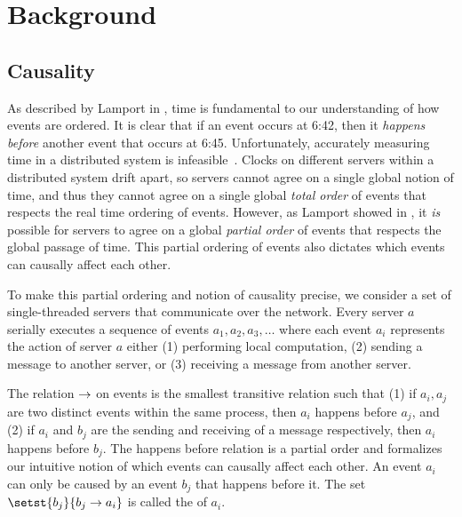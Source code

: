 \newcommand{\ttt}[1]{\texttt{#1}}

\section{Background}

\subsection{Causality}
As described by Lamport in \cite{lamport1978time}, time is fundamental to our
understanding of how events are ordered. It is clear that if an event occurs at
6:42, then it \emph{happens before} another event that occurs at 6:45.
Unfortunately, accurately measuring time in a distributed system is
infeasible~\cite{marzullo1984maintaining, sampath2012synchronization,
schmid2000orthogonal}. Clocks on different servers within a distributed system
drift apart, so servers cannot agree on a single global notion of time, and
thus they cannot agree on a single global \emph{total order} of events that
respects the real time ordering of events. However, as Lamport showed in
\cite{lamport1978time}, it \emph{is} possible for servers to agree on a global
\emph{partial order} of events that respects the global passage of time. This
partial ordering of events also dictates which events can causally affect each
other.

To make this partial ordering and notion of causality precise, we consider a
set of single-threaded servers that communicate over the network. Every server
$a$ serially executes a sequence of events $a_1, a_2, a_3, \ldots$ where each
event $a_i$ represents the action of server $a$ either (1) performing local
computation, (2) sending a message to another server, or (3) receiving a
message from another server.



The  relation $\to$ on events is the
smallest transitive relation such that
%
(1)
  if $a_i, a_j$ are two distinct events within the same process, then $a_i$
  happens before $a_j$, and
(2)
  if $a_i$ and $b_j$ are the sending and receiving of a message respectively,
  then $a_i$ happens before $b_j$.
%
The happens before relation is a partial order and formalizes our intuitive
notion of which events can causally affect each other.  An event $a_i$ can only
be caused by an event $b_j$ that happens before it.  The set $\setst{b_j}{b_j
\happensbefore a_i}$ is called the  of $a_i$.

